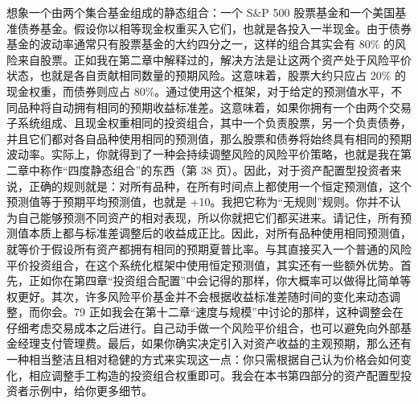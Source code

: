 \begin{chineseblock}想象一个由两个集合基金组成的静态组合：一个 S\&P 500 股票基金和一个美国基准债券基金。假设你以相等现金权重买入它们，也就是各投入一半现金。由于债券基金的波动率通常只有股票基金的大约四分之一，这样的组合其实会有 80\% 的风险来自股票。正如我在第二章中解释过的，解决方法是让这两个资产处于风险平价状态，也就是各自贡献相同数量的预期风险。这意味着，股票大约只应占 20\% 的现金权重，而债券则应占 80\%。通过使用这个框架，对于给定的预测值水平，不同品种将自动拥有相同的预期收益标准差。这意味着，如果你拥有一个由两个交易子系统组成、且现金权重相同的投资组合，其中一个负责股票，另一个负责债券，并且它们都对各自品种使用相同的预测值，那么股票和债券将始终具有相同的预期波动率。实际上，你就得到了一种会持续调整风险的风险平价策略，也就是我在第二章中称作“四度静态组合”的东西（第 38 页）。因此，对于资产配置型投资者来说，正确的规则就是：对所有品种，在所有时间点上都使用一个恒定预测值，这个预测值等于预期平均预测值，也就是 +10。我把它称为“无规则”规则。你并不认为自己能够预测不同资产的相对表现，所以你就把它们都买进来。请记住，所有预测值本质上都与标准差调整后的收益成正比。因此，对所有品种使用相同预测值，就等价于假设所有资产都拥有相同的预期夏普比率。与其直接买入一个普通的风险平价投资组合，在这个系统化框架中使用恒定预测值，其实还有一些额外优势。首先，正如你在第四章“投资组合配置”中会记得的那样，你大概率可以做得比简单等权更好。其次，许多风险平价基金并不会根据收益标准差随时间的变化来动态调整，而你会。79 正如我会在第十二章“速度与规模”中讨论的那样，这种调整会在仔细考虑交易成本之后进行。自己动手做一个风险平价组合，也可以避免向外部基金经理支付管理费。最后，如果你确实决定引入对资产收益的主观预期，那么还有一种相当整洁且相对稳健的方式来实现这一点：你只需根据自己认为价格会如何变化，相应调整手工构造的投资组合权重即可。我会在本书第四部分的资产配置型投资者示例中，给你更多细节。\end{chineseblock}



